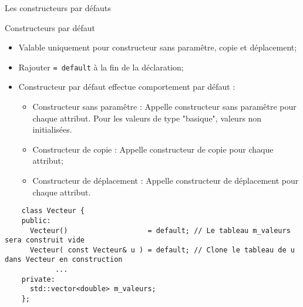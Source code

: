 \documentclass[compress,10pt,aspectratio=169]{beamer}
\begin{document}
    \begin{frame}[fragile]{Les constructeurs par défauts}
    \scriptsize
    \begin{block}{\small Constructeurs par défaut}
      \begin{itemize}
        \item Valable uniquement pour constructeur sans paramêtre, copie et déplacement;
        \item Rajouter \texttt{= default} à la fin de la déclaration;
        \item Constructeur par défaut effectue comportement par défaut :
        \begin{itemize}
        \scriptsize
        \item Constructeur sans paramêtre : Appelle constructeur sans paramêtre pour chaque attribut.
              Pour les valeurs de type "basique", valeurs non initialisées.
        \item Constructeur de copie : Appelle constructeur de copie pour chaque attribut;
        \item Constructeur de déplacement : Appelle constructeur de déplacement pour chaque attribut.
        \end{itemize}
      \end{itemize}
    \end{block}
    
    \begin{verbatim}
    class Vecteur {
    public:
      Vecteur()                   = default; // Le tableau m_valeurs sera construit vide
      Vecteur( const Vecteur& u ) = default; // Clone le tableau de u dans Vecteur en construction
            ...
    private:
      std::vector<double> m_valeurs;
    };
    \end{verbatim}
    \end{frame}  
    
\end{document}
